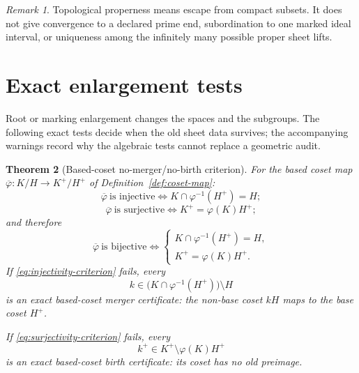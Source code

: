\documentclass[11pt,reqno]{amsart}
\newtheorem{theorem}{Theorem}[section]
\theoremstyle{definition}
\theoremstyle{remark}
\newtheorem{remark}[theorem]{Remark}
\begin{document}
\begin{remark}
Topological properness means escape from compact subsets.  It does not
give convergence to a declared prime end, subordination to one marked
ideal interval, or uniqueness among the infinitely many possible
proper sheet lifts.
\end{remark}

\section{Exact enlargement tests}
\label{sec:enlargement}

Root or marking enlargement changes the spaces and the subgroups.  The
following exact tests decide when the old sheet data survives; the
accompanying warnings record why the algebraic tests cannot replace a
geometric audit.

\begin{theorem}[Based-coset no-merger/no-birth criterion]\label{thm:coset-criterion}
For the based coset map \( \overline\varphi\colon K/H\to K^+/H^+ \) of Definition~\ref{def:coset-map}:
\begin{equation}\label{eq:injectivity-criterion}
  \overline\varphi\ \text{is injective}
  \iff
  K\cap\varphi^{-1}(H^+)=H;
\end{equation}
\begin{equation}\label{eq:surjectivity-criterion}
  \overline\varphi\ \text{is surjective}
  \iff
  K^+=\varphi(K)H^+;
\end{equation}
and therefore
\begin{equation}\label{eq:bijectivity-criterion}
  \overline\varphi\ \text{is bijective}
  \iff
  \begin{cases}
    K\cap\varphi^{-1}(H^+)=H,\\[2pt]
    K^+=\varphi(K)H^+ .
  \end{cases}
\end{equation}
If \eqref{eq:injectivity-criterion} fails, every
\begin{equation}\label{eq:merger-certificate}
  k\in\bigl(K\cap\varphi^{-1}(H^+)\bigr)\setminus H
\end{equation}
is an exact \emph{based-coset merger certificate}: the non-base coset \( kH \) maps to the base coset \( H^+ \).

If \eqref{eq:surjectivity-criterion} fails, every
\begin{equation}\label{eq:birth-certificate}
  k^+\in K^+\setminus\varphi(K)H^+
\end{equation}
is an exact \emph{based-coset birth certificate}: its coset has no old preimage.
\end{theorem}
\end{document}
